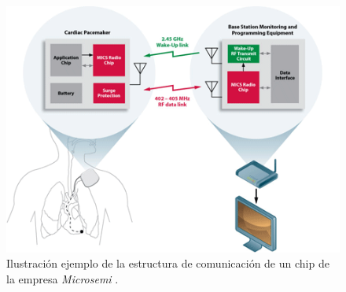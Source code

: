 \begin{figure}[!htb]
    \centering
    \includegraphics[scale=0.6]{./Introduccion/medical-cardicpacemaker}
    \caption{Ilustración ejemplo de la estructura de comunicación de un chip de la empresa \textit{Microsemi} \cite{zarlink}.}
    \label{fig:fig3.5}
\end{figure}

